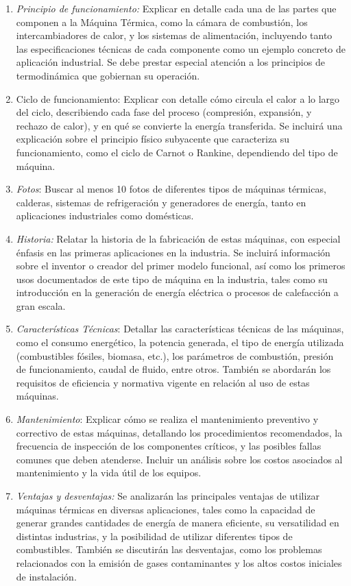 \documentclass[../main]{subfiles}
\begin{document}
\begin{enumerate}
    \item \emph{Principio de funcionamiento:} Explicar en detalle cada una de las partes que componen a la Máquina Térmica, como la cámara de combustión, los intercambiadores de calor, y los sistemas de alimentación, incluyendo tanto las especificaciones técnicas de cada componente como un ejemplo concreto de aplicación industrial. Se debe prestar especial atención a los principios de termodinámica que gobiernan su operación.
    \item Ciclo de funcionamiento: Explicar con detalle cómo circula el calor a lo largo del ciclo, describiendo cada fase del proceso (compresión, expansión, y rechazo de calor), y en qué se convierte la energía transferida. Se incluirá una explicación sobre el principio físico subyacente que caracteriza su funcionamiento, como el ciclo de Carnot o Rankine, dependiendo del tipo de máquina.
    \item \emph{Fotos}: Buscar al menos 10 fotos de diferentes tipos de máquinas térmicas, calderas, sistemas de refrigeración y generadores de energía, tanto en aplicaciones industriales como domésticas.
    \item \emph{Historia:} Relatar la historia de la fabricación de estas máquinas, con especial énfasis en las primeras aplicaciones en la industria. Se incluirá información sobre el inventor o creador del primer modelo funcional, así como los primeros usos documentados de este tipo de máquina en la industria, tales como su introducción en la generación de energía eléctrica o procesos de calefacción a gran escala.
    \item \emph{Características Técnicas}: Detallar las características técnicas de las máquinas, como el consumo energético, la potencia generada, el tipo de energía utilizada (combustibles fósiles, biomasa, etc.), los parámetros de combustión, presión de funcionamiento, caudal de fluido, entre otros. También se abordarán los requisitos de eficiencia y normativa vigente en relación al uso de estas máquinas.
    \item \emph{Mantenimiento}: Explicar cómo se realiza el mantenimiento preventivo y correctivo de estas máquinas, detallando los procedimientos recomendados, la frecuencia de inspección de los componentes críticos, y las posibles fallas comunes que deben atenderse. Incluir un análisis sobre los costos asociados al mantenimiento y la vida útil de los equipos.
    \item \emph{Ventajas y desventajas:} Se analizarán las principales ventajas de utilizar máquinas térmicas en diversas aplicaciones, tales como la capacidad de generar grandes cantidades de energía de manera eficiente, su versatilidad en distintas industrias, y la posibilidad de utilizar diferentes tipos de combustibles. También se discutirán las desventajas, como los problemas relacionados con la emisión de gases contaminantes y los altos costos iniciales de instalación.

\end{enumerate}
\end{document}
